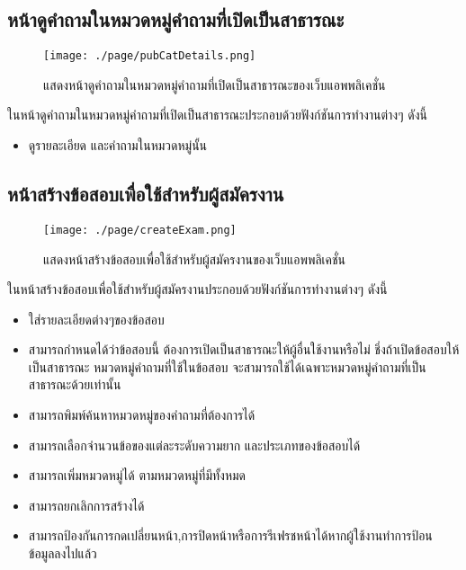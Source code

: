\subsection{หน้าดูคำถามในหมวดหมู่คำถามที่เปิดเป็นสาธารณะ}
\begin{figure}[H]
  \centering
  \texttt{[image: ./page/pubCatDetails.png]}
  \caption{แสดงหน้าดูคำถามในหมวดหมู่คำถามที่เปิดเป็นสาธารณะของเว็บแอพพลิเคชั่น}
  \label{Fig:pubCatDetail}
\end{figure}
ในหน้าดูคำถามในหมวดหมู่คำถามที่เปิดเป็นสาธารณะประกอบด้วยฟังก์ชันการทำงานต่างๆ ดังนี้
\begin{itemize}
  \item ดูรายละเอียด และคำถามในหมวดหมู่นั้น
\end{itemize}

\subsection{หน้าสร้างข้อสอบเพื่อใช้สำหรับผู้สมัครงาน}
\begin{figure}[H]
  \centering
  \texttt{[image: ./page/createExam.png]}
  \caption{แสดงหน้าสร้างข้อสอบเพื่อใช้สำหรับผู้สมัครงานของเว็บแอพพลิเคชั่น}
  \label{Fig:createExam}
\end{figure}
ในหน้าสร้างข้อสอบเพื่อใช้สำหรับผู้สมัครงานประกอบด้วยฟังก์ชันการทำงานต่างๆ ดังนี้
\begin{itemize}
    \item ใส่รายละเอียดต่างๆของข้อสอบ
    \item สามารถกำหนดได้ว่าข้อสอบนี้ ต้องการเปิดเป็นสาธารณะให้ผู้อื่นใช้งานหรือไม่ ชึ่งถ้าเปิดข้อสอบให้เป็นสาธารณะ หมวดหมู่คำถามที่ใช้ในข้อสอบ จะสามารถใช้ได้เฉพาะหมวดหมู่คำถามที่เป็นสาธารณะด้วยเท่านั้น
    \item สามารถพิมพ์ค้นหาหมวดหมู่ของคำถามที่ต้องการได้
    \item สามารถเลือกจำนวนข้อของแต่ละระดับความยาก และประเภทของข้อสอบได้
    \item สามารถเพิ่มหมวดหมู่ได้ ตามหมวดหมู่ที่มีทั้งหมด
    \item สามารถยกเลิกการสร้างได้
    \item สามารถป้องกันการกดเปลี่ยนหน้า,การปิดหน้าหรือการรีเฟรชหน้าได้หากผู้ใช้งานทําการป้อน ข้อมูลลงไปแล้ว
\end{itemize}

